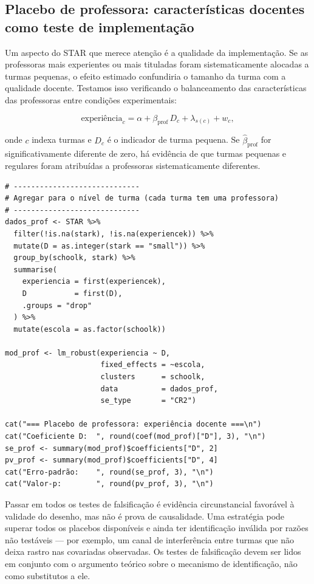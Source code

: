 \subsection*{Placebo de professora: características docentes como teste de implementação}

Um aspecto do STAR que merece atenção é a qualidade da implementação. Se as professoras mais experientes ou mais tituladas foram sistematicamente alocadas a turmas pequenas, o efeito estimado confundiria o tamanho da turma com a qualidade docente. Testamos isso verificando o balanceamento das características das professoras entre condições experimentais:

\begin{equation}
  \text{experiência}_{c} = \alpha + \beta_{\text{prof}}\, D_c + \lambda_{s(c)} + w_c,
  \label{eq:placebo_prof}
\end{equation}

onde $c$ indexa turmas e $D_c$ é o indicador de turma pequena. Se $\hat{\beta}_{\text{prof}}$ for significativamente diferente de zero, há evidência de que turmas pequenas e regulares foram atribuídas a professoras sistematicamente diferentes.

\begin{lstlisting}[style=Rstyle, caption={Balanceamento de características das professoras entre condições}]
# -----------------------------
# Agregar para o nível de turma (cada turma tem uma professora)
# -----------------------------
dados_prof <- STAR %>%
  filter(!is.na(stark), !is.na(experiencek)) %>%
  mutate(D = as.integer(stark == "small")) %>%
  group_by(schoolk, stark) %>%
  summarise(
    experiencia = first(experiencek),
    D           = first(D),
    .groups = "drop"
  ) %>%
  mutate(escola = as.factor(schoolk))

mod_prof <- lm_robust(experiencia ~ D,
                      fixed_effects = ~escola,
                      clusters      = schoolk,
                      data          = dados_prof,
                      se_type       = "CR2")

cat("=== Placebo de professora: experiência docente ===\n")
cat("Coeficiente D:  ", round(coef(mod_prof)["D"], 3), "\n")
se_prof <- summary(mod_prof)$coefficients["D", 2]
pv_prof <- summary(mod_prof)$coefficients["D", 4]
cat("Erro-padrão:    ", round(se_prof, 3), "\n")
cat("Valor-p:        ", round(pv_prof, 3), "\n")
\end{lstlisting}

\begin{atencaobox}
Passar em todos os testes de falsificação é evidência circunstancial favorável à validade do desenho, mas não é prova de causalidade. Uma estratégia pode superar todos os placebos disponíveis e ainda ter identificação inválida por razões não testáveis --- por exemplo, um canal de interferência entre turmas que não deixa rastro nas covariadas observadas. Os testes de falsificação devem ser lidos em conjunto com o argumento teórico sobre o mecanismo de identificação, não como substitutos a ele.
\end{atencaobox}


